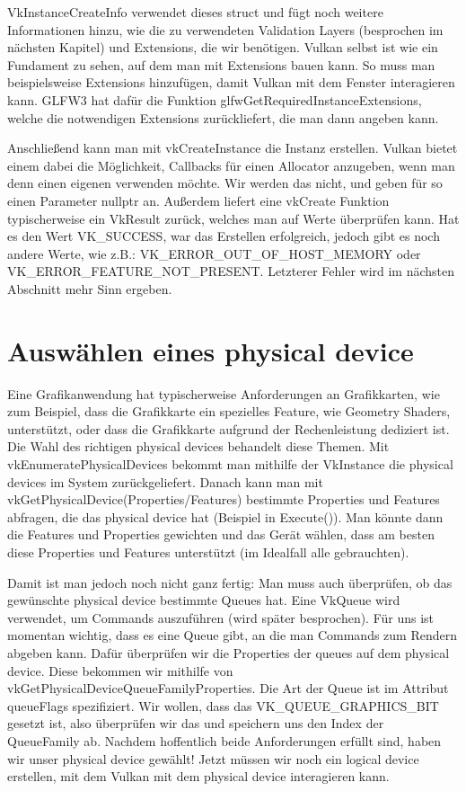 \documentclass[11pt,a4paper]{report}
\begin{document}
VkInstanceCreateInfo verwendet dieses struct und fügt noch weitere Informationen hinzu, wie die zu verwendeten Validation Layers (besprochen im nächsten Kapitel) und Extensions, die wir benötigen. Vulkan selbst ist wie ein Fundament zu sehen, auf dem man mit Extensions bauen kann. So muss man beispielsweise Extensions hinzufügen, damit Vulkan mit dem Fenster interagieren kann. GLFW3 hat dafür die Funktion glfwGetRequiredInstanceExtensions, welche die notwendigen Extensions zurückliefert, die man dann angeben kann.

Anschließend kann man mit vkCreateInstance die Instanz erstellen. Vulkan bietet einem dabei die Möglichkeit, Callbacks für einen Allocator anzugeben, wenn man denn einen eigenen verwenden möchte. Wir werden das nicht, und geben für so einen Parameter nullptr an. Außerdem liefert eine vkCreate Funktion typischerweise ein VkResult zurück, welches man auf Werte überprüfen kann. Hat es den Wert VK\_SUCCESS, war das Erstellen erfolgreich, jedoch gibt es noch andere Werte, wie z.B.: VK\_ERROR\_OUT\_OF\_HOST\_MEMORY oder VK\_ERROR\_FEATURE\_NOT\_PRESENT. Letzterer Fehler wird im nächsten Abschnitt mehr Sinn ergeben.

\section{Auswählen eines physical device}
Eine Grafikanwendung hat typischerweise Anforderungen an Grafikkarten, wie zum Beispiel, dass die Grafikkarte ein spezielles Feature, wie Geometry Shaders, unterstützt, oder dass die Grafikkarte aufgrund der Rechenleistung dediziert ist. Die Wahl des richtigen physical devices behandelt diese Themen. Mit vkEnumeratePhysicalDevices bekommt man mithilfe der VkInstance die physical devices im System zurückgeliefert. Danach kann man mit vkGetPhysicalDevice(Properties/Features) bestimmte Properties und Features abfragen, die das physical device hat (Beispiel in Execute()). Man könnte dann die Features und Properties gewichten und das Gerät wählen, dass am besten diese Properties und Features unterstützt (im Idealfall alle gebrauchten).

Damit ist man jedoch noch nicht ganz fertig: Man muss auch überprüfen, ob das gewünschte physical device bestimmte Queues hat. Eine VkQueue wird verwendet, um Commands auszuführen (wird später besprochen). Für uns ist momentan wichtig, dass es eine Queue gibt, an die man Commands zum Rendern abgeben kann. Dafür überprüfen wir die Properties der queues auf dem physical device. Diese bekommen wir mithilfe von vkGetPhysicalDeviceQueueFamilyProperties. Die Art der Queue ist im Attribut queueFlags spezifiziert. Wir wollen, dass das VK\_QUEUE\_GRAPHICS\_BIT gesetzt ist, also überprüfen wir das und speichern uns den Index der QueueFamily ab. Nachdem hoffentlich beide Anforderungen erfüllt sind, haben wir unser physical device gewählt! Jetzt müssen wir noch ein logical device erstellen, mit dem Vulkan mit dem physical device interagieren kann.
\end{document}

